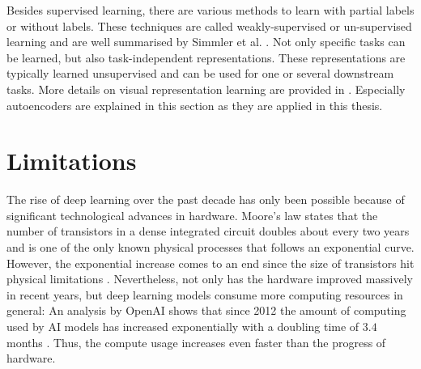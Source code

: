 Besides supervised learning, there are various methods to learn with partial labels or without labels.
These techniques are called weakly-supervised or un-supervised learning and are well summarised by Simmler et al. .
Not only specific tasks can be learned, but also task-independent representations.
These representations are typically learned unsupervised and can be used for one or several downstream tasks.
More details on visual representation learning are provided in .
Especially autoencoders  are explained in this section as they are applied in this thesis.


\section{Limitations}
The rise of deep learning over the past decade has only been possible because of significant technological advances in hardware.
Moore's law  states that the number of transistors in a dense integrated circuit doubles about every two years and is one of the only known physical processes that follows an exponential curve.
However, the exponential increase comes to an end since the size of transistors hit physical limitations .
Nevertheless, not only has the hardware improved massively in recent years, but deep learning models consume more computing resources in general:
An analysis by OpenAI shows that since 2012 the amount of computing used by AI models has increased exponentially with a doubling time of \(3.4\) months .
Thus, the compute usage increases even faster than the progress of hardware.

